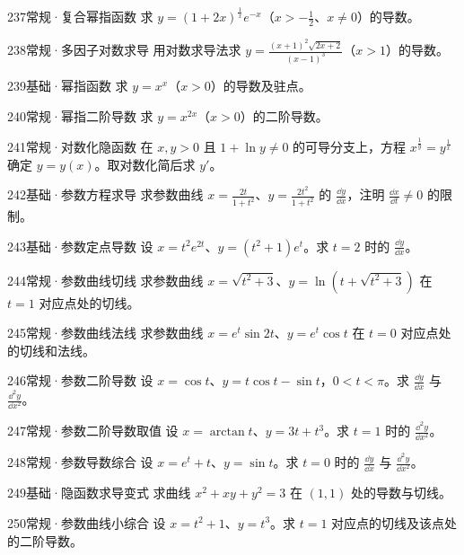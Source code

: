 \begin{exercise}{237}{常规·复合幂指函数}
求 $y=(1+2x)^{\frac{1}{x}}e^{-x}$（$x>-\frac{1}{2}$、$x\ne0$）的导数。
\end{exercise}
\begin{exercise}{238}{常规·多因子对数求导}
用对数求导法求 $y=\frac{(x+1)^2\sqrt{2x+2}}{(x-1)^3}$（$x>1$）的导数。
\end{exercise}
\begin{exercise}{239}{基础·幂指函数}
求 $y=x^x$（$x>0$）的导数及驻点。
\end{exercise}
\begin{exercise}{240}{常规·幂指二阶导数}
求 $y=x^{2x}$（$x>0$）的二阶导数。
\end{exercise}
\begin{exercise}{241}{常规·对数化隐函数}
在 $x,y>0$ 且 $1+\ln y\ne0$ 的可导分支上，方程 $x^{\frac{1}{y}}=y^{\frac{1}{x}}$ 确定 $y=y(x)$。取对数化简后求 $y'$。
\end{exercise}
\begin{exercise}{242}{基础·参数方程求导}
求参数曲线 $x=\frac{2t}{1+t^2}$、$y=\frac{2t^2}{1+t^2}$ 的 $\frac{\dd y}{\dd x}$，注明 $\frac{\dd x}{\dd t}\ne0$ 的限制。
\end{exercise}
\begin{exercise}{243}{基础·参数定点导数}
设 $x=t^2e^{2t}$、$y=(t^2+1)e^t$。求 $t=2$ 时的 $\frac{\dd y}{\dd x}$。
\end{exercise}
\begin{exercise}{244}{常规·参数曲线切线}
求参数曲线 $x=\sqrt{t^2+3}$、$y=\ln(t+\sqrt{t^2+3})$ 在 $t=1$ 对应点处的切线。
\end{exercise}
\begin{exercise}{245}{常规·参数曲线法线}
求参数曲线 $x=e^t\sin2t$、$y=e^t\cos t$ 在 $t=0$ 对应点处的切线和法线。
\end{exercise}
\begin{exercise}{246}{常规·参数二阶导数}
设 $x=\cos t$、$y=t\cos t-\sin t$，$0<t<\pi$。求 $\frac{\dd y}{\dd x}$ 与 $\frac{\dd^2y}{\dd x^2}$。
\end{exercise}
\begin{exercise}{247}{常规·参数二阶导数取值}
设 $x=\arctan t$、$y=3t+t^3$。求 $t=1$ 时的 $\frac{\dd^2y}{\dd x^2}$。
\end{exercise}
\begin{exercise}{248}{常规·参数导数综合}
设 $x=e^t+t$、$y=\sin t$。求 $t=0$ 时的 $\frac{\dd y}{\dd x}$ 与 $\frac{\dd^2y}{\dd x^2}$。
\end{exercise}
\begin{exercise}{249}{基础·隐函数求导变式}
求曲线 $x^2+xy+y^2=3$ 在 $(1,1)$ 处的导数与切线。
\end{exercise}
\begin{exercise}{250}{常规·参数曲线小综合}
设 $x=t^2+1$、$y=t^3$。求 $t=1$ 对应点的切线及该点处的二阶导数。
\end{exercise}

